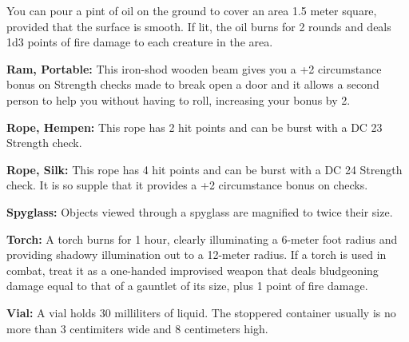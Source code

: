 You can pour a pint of oil on the ground to cover an area 1.5 meter square, provided that the surface is smooth. If lit, the oil burns for 2 rounds and deals 1d3 points of fire damage to each creature in the area.

\textbf{Ram, Portable:} This iron-shod wooden beam gives you a +2 circumstance bonus on Strength checks made to break open a door and it allows a second person to help you without having to roll, increasing your bonus by 2.

\textbf{Rope, Hempen:} This rope has 2 hit points and can be burst with a DC 23 Strength check.

\textbf{Rope, Silk:} This rope has 4 hit points and can be burst with a DC 24 Strength check. It is so supple that it provides a +2 circumstance bonus on  checks.

\textbf{Spyglass:} Objects viewed through a spyglass are magnified to twice their size.

\textbf{Torch:} A torch burns for 1 hour, clearly illuminating a 6-meter foot radius and providing shadowy illumination out to a 12-meter radius. If a torch is used in combat, treat it as a one-handed improvised weapon that deals bludgeoning damage equal to that of a gauntlet of its size, plus 1 point of fire damage.

\textbf{Vial:} A vial holds 30 milliliters of liquid. The stoppered container usually is no more than 3 centimiters wide and 8 centimeters high.
